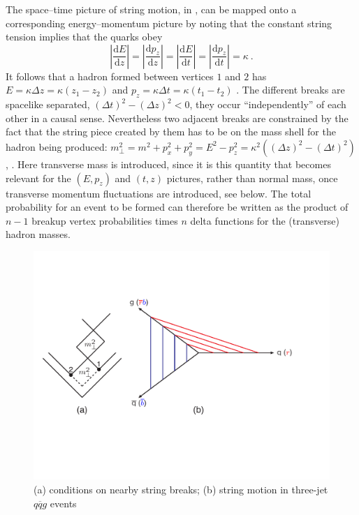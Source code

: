The space--time picture of string motion, \eg in 
, can be mapped onto a corresponding 
energy--momentum picture by noting that the constant string tension 
implies that the quarks obey 
\begin{equation}
\left| \frac{\mathrm{d}E}{\mathrm{d}z} \right| =
\left| \frac{\mathrm{d}p_z}{\mathrm{d}z} \right| = 
\left| \frac{\mathrm{d}E}{\mathrm{d}t} \right| =
\left| \frac{\mathrm{d}p_z}{\mathrm{d}t} \right| = \kappa ~.
\label{eq:stringtension}
\end{equation}
It follows that a hadron formed between vertices $1$ and $2$ has 
$E = \kappa\Delta z = \kappa(z_1 - z_2)$ and 
$p_z = \kappa\Delta t = \kappa(t_1 - t_2)$ 
\cite{Andersson:1983ia}. The different breaks are spacelike separated, 
$(\Delta t)^2 - (\Delta z)^2 < 0$, \ie they occur ``independently'' 
of each other in a causal sense. Nevertheless two adjacent
breaks are constrained by the fact that the string piece created
by them has to be on the mass shell for the hadron being produced:
$m_{\perp}^2 = m^2 + p_x^2 + p_y^2 = E^2 - p_z^2 = %
\kappa^2((\Delta z)^2 - (\Delta t)^2)$,
. Here transverse mass is introduced, since
it is this quantity that becomes relevant for the $(E, p_z)$ and 
$(t, z)$ pictures, rather than normal mass, once transverse momentum 
fluctuations are introduced, see below. The total probability for an 
event to be formed can therefore be written as the product of $n-1$ 
breakup vertex probabilities times $n$ delta functions for the 
(transverse) hadron masses.

\begin{figure}
\includegraphics[width=\textwidth]{hadronization/stringtwo.pdf} 
\caption{(a) conditions on nearby string breaks;
(b) string motion in three-jet $q\overline{q}g$ events
\label{fig:stringtwo}}
\end{figure}

